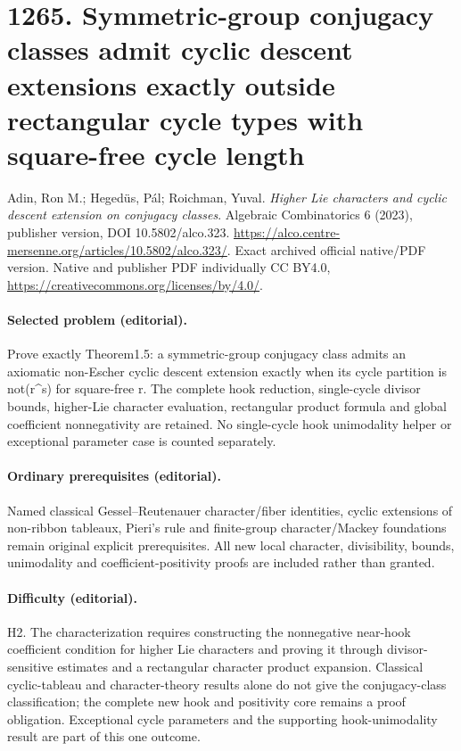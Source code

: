\documentclass[10pt]{article}
\theoremstyle{definition}
\begin{document}
\section*{1265. Symmetric-group conjugacy classes admit cyclic descent extensions exactly outside rectangular cycle types with square-free cycle length}
Adin, Ron M.; Hegedüs, Pál; Roichman, Yuval. \emph{Higher Lie characters and cyclic descent extension on conjugacy classes}. Algebraic Combinatorics 6 (2023), publisher version, DOI 10.5802/alco.323. \url{https://alco.centre-mersenne.org/articles/10.5802/alco.323/}. Exact archived official native/PDF version. Native and publisher PDF individually CC BY4.0, \url{https://creativecommons.org/licenses/by/4.0/}.
\paragraph{Selected problem (editorial).} Prove exactly Theorem1.5: a symmetric-group conjugacy class admits an axiomatic non-Escher cyclic descent extension exactly when its cycle partition is not(r\textasciicircum{}s) for square-free r. The complete hook reduction, single-cycle divisor bounds, higher-Lie character evaluation, rectangular product formula and global coefficient nonnegativity are retained. No single-cycle hook unimodality helper or exceptional parameter case is counted separately.
\paragraph{Ordinary prerequisites (editorial).} Named classical Gessel--Reutenauer character/fiber identities, cyclic extensions of non-ribbon tableaux, Pieri’s rule and finite-group character/Mackey foundations remain original explicit prerequisites. All new local character, divisibility, bounds, unimodality and coefficient-positivity proofs are included rather than granted.
\paragraph{Difficulty (editorial).} H2. The characterization requires constructing the nonnegative near-hook coefficient condition for higher Lie characters and proving it through divisor-sensitive estimates and a rectangular character product expansion. Classical cyclic-tableau and character-theory results alone do not give the conjugacy-class classification; the complete new hook and positivity core remains a proof obligation. Exceptional cycle parameters and the supporting hook-unimodality result are part of this one outcome.
\end{document}
